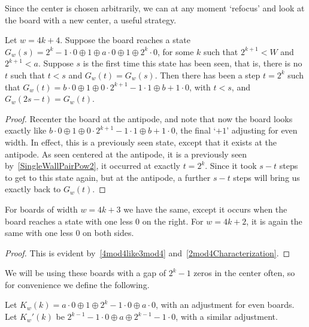 \documentclass[12pt,letterpaper]{article}
\begin{document}
Since the center is chosen arbitrarily, we can at any moment `refocus' and look at the board with a new center, a useful strategy. 
\begin{prop}\label{SymmetricAntipode}
  Let $w=4k+4$. Suppose the board reaches a state $G_w(s)=2^k-1\cdot 0\oplus 1\oplus a\cdot 0\oplus 1\oplus 2^k\cdot 0$, for some $k$ such that $2^{k+1}<W$ and $2^{k+1}<a$. Suppose $s$ is the first time this state has been seen, that is, there is no $t$ such that $t<s$ and $G_w(t)=G_w(s)$. Then there has been a step $t=2^k$ such that $G_w(t)=b\cdot 0 \oplus 1\oplus 0\cdot 2^{k+1}-1\cdot 1\oplus b+1\cdot 0$, with $t<s$, and $G_w(2s-t)=G_w(t)$. 
\end{prop}
\begin{proof} Recenter the board at the antipode, and note that now the board looks exactly like $b\cdot 0 \oplus 1\oplus 0\cdot 2^{k+1}-1\cdot 1\oplus b+1\cdot 0$, the final `$+1$' adjusting for even width. In effect, this is a previously seen state, except that it exists at the antipode. As seen centered at the antipode, it is a previously seen by~\cref{SingleWallPairPow2}, it occurred at exactly $t=2^k$. Since it took $s-t$ steps to get to this state again, but at the antipode, a further $s-t$ steps will bring us exactly back to $G_w(t)$.
\end{proof}
\begin{cor}\label{SymmetricAntipodeAll}
  For boards of width $w=4k+3$ we have the same, except it occurs when the board reaches a state with one less 0 on the right. For $w=4k+2$, it is again the same with one less 0 on both sides. 
\end{cor}
\begin{proof}
  This is evident by~\cref{4mod4like3mod4} and~\cref{2mod4Characterization}. 
\end{proof}
We will be using these boards with a gap of $2^k-1$ zeros in the center often, so for convenience we define the following.
\begin{dfn}
  Let $K_w(k)=a\cdot 0\oplus 1\oplus 2^k-1\cdot 0\oplus a\cdot 0$, with an adjustment for even boards. Let $K_w'(k)$ be $2^{k-1}-1\cdot 0\oplus a\oplus 2^{k-1}-1\cdot 0$, with a similar adjustment.
\end{dfn}
\end{document}
